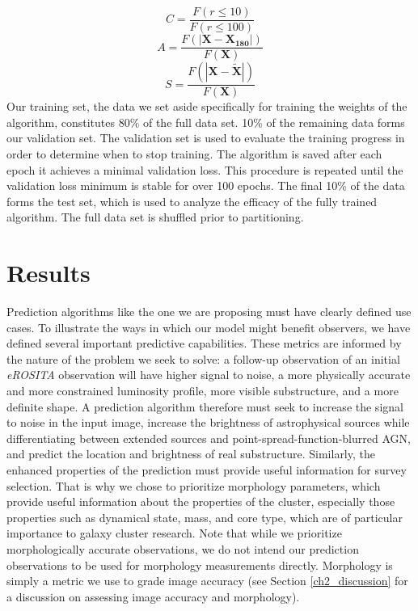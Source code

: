 \begin{equation}\label{fixed_c}
    C = \frac{F(r \leq 10)}{F( r \leq 100)}
\end{equation}
\begin{equation}\label{fixed_a}
    A = \frac{F(|\mathbf{X}-\mathbf{X_{180}}|)}{F(\mathbf{X})}
\end{equation}
\begin{equation}\label{fixed_s}
    S = \frac{F(|\mathbf{X}-\mathbf{\tilde{X}}|)}{F(\mathbf{X})}
\end{equation}
Our training set, the data we set aside specifically for training the weights of the algorithm, constitutes 80\% of the full data set. 10\% of the remaining data forms our validation set. The validation set is used to evaluate the training progress in order to determine when to stop training. The algorithm is saved after each epoch it achieves a minimal validation loss. This procedure is repeated until the validation loss minimum is stable for over 100 epochs. The final 10\% of the data forms the test set, which is used to analyze the efficacy of the fully trained algorithm. The full data set is shuffled prior to partitioning.

\section{Results}\label{ch2_results}
Prediction algorithms like the one we are proposing must have clearly defined use cases. To illustrate the ways in which our model might benefit observers, we have defined several important predictive capabilities. These metrics are informed by the nature of the problem we seek to solve:  a follow-up observation of an initial \textit{eROSITA} observation will have higher signal to noise, a more physically accurate and more constrained luminosity profile, more visible substructure, and a more definite shape.  A prediction algorithm therefore must seek to increase the signal to noise in the input image, increase the brightness of astrophysical sources while differentiating between extended sources and point-spread-function-blurred AGN, and predict the location and brightness of real substructure. Similarly, the enhanced properties of the prediction must provide useful information for survey selection. That is why we chose to prioritize morphology parameters, which provide useful information about the properties of the cluster, especially those properties such as dynamical state, mass, and core type, which are of particular importance to galaxy cluster research. Note that while we prioritize morphologically accurate observations, we do not intend our prediction observations to be used for morphology measurements directly. Morphology is simply a metric we use to grade image accuracy (see Section \ref{ch2_discussion} for a discussion on assessing image accuracy and morphology).

